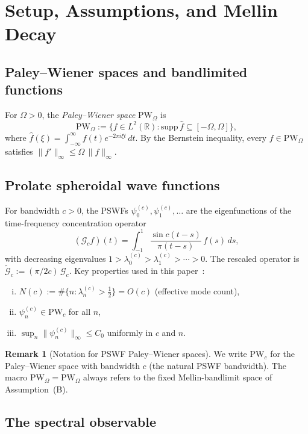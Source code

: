 \documentclass[12pt,a4paper]{amsart}
\theoremstyle{definition}
\newtheorem{remark}[theorem]{Remark}
\newcommand{\PW}{\mathrm{PW}_\Omega}
\newcommand{\Gc}{\mathcal{G}_c}
\newcommand{\tGc}{\widetilde{\mathcal{G}}_c}
\begin{document}
\section{Setup, Assumptions, and Mellin Decay}
\label{sec:setup}

\subsection{Paley--Wiener spaces and bandlimited functions}

For $\Omega > 0$, the \emph{Paley--Wiener space} $\PW$ is
\[
\PW
:= \bigl\{f \in L^2(\mathbb{R}) :
\mathrm{supp}\,\hat{f}
\subseteq [-\Omega,\Omega]\bigr\},
\]
where $\hat{f}(\xi)
= \int_{-\infty}^\infty f(t)e^{-2\pi i \xi t}\,dt$.
By the Bernstein inequality, every $f \in \PW$ satisfies
$\|f'\|_\infty \le \Omega\,\|f\|_\infty$.

\subsection{Prolate spheroidal wave functions}

For bandwidth $c > 0$, the PSWFs
$\psi_0^{(c)}, \psi_1^{(c)}, \ldots$ are the
eigenfunctions of the time-frequency concentration
operator
\[
(\Gc f)(t)
= \int_{-1}^{1}
\frac{\sin c(t-s)}{\pi(t-s)}\,f(s)\,ds,
\]
with decreasing eigenvalues
$1 > \lambda_0^{(c)} > \lambda_1^{(c)}
> \cdots > 0$.
The rescaled operator is $\tGc := (\pi/2c)\,\Gc$.
Key properties used in this
paper~\cite{Slepian1961,Landau1962}:
\begin{enumerate}[(i)]
\item $N(c) := \#\{n : \lambda_n^{(c)} > \tfrac{1}{2}\}
= O(c)$ (effective mode count),
\item $\psi_n^{(c)} \in \mathrm{PW}_c$ for all $n$,
\item $\sup_n \|\psi_n^{(c)}\|_\infty \le C_0$
uniformly in $c$ and $n$.
\end{enumerate}

\begin{remark}[Notation for PSWF Paley--Wiener spaces]
\label{rem:pw-notation}
We write $\mathrm{PW}_c$ for the Paley--Wiener space
with bandwidth $c$ (the natural PSWF bandwidth).
The macro $\PW = \mathrm{PW}_\Omega$ always refers to
the fixed Mellin-bandlimit space of Assumption~(B).
\end{remark}

\subsection{The spectral observable}
\end{document}
